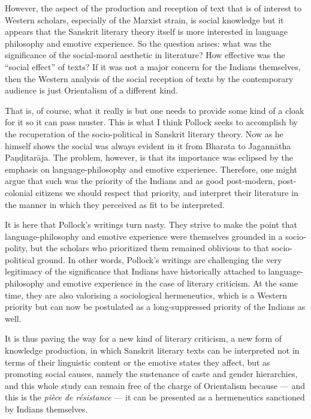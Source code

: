 However, the aspect of the production and reception of text that is of interest to Western scholars, especially of the Marxist strain, is social knowledge but it appears that the Sanskrit literary theory itself is more interested in language philosophy and emotive experience. So the question arises: what was the significance of the social-moral aesthetic in literature? How effective was the ``social effect'' of texts? If it was not a major concern for the Indians themselves, then the Western analysis of the social reception of texts by the contemporary audience is just Orientalism of a different kind.

That is, of course, what it really is but one needs to provide some kind of a cloak for it so it can pass muster. This is what I think Pollock seeks to accomplish by the recuperation of the socio-political in Sanskrit literary theory. Now as he himself shows the social was always evident in it from Bharata to Jagannātha Paṇḍitarāja. The problem, however, is that its importance was eclipsed by the emphasis on language-philosophy and emotive experience. Therefore, one might argue that such was the priority of the Indians and as good post-modern, post-colonial citizens we should respect that priority, and interpret their literature in the manner in which they perceived as fit to be interpreted. 


It is here that Pollock's writings turn nasty. They strive to make the point that language-philosophy and emotive experience were themselves grounded in a socio-polity, but the scholars who prioritized them remained oblivious to that socio-political ground. In other words, Pollock's writings are challenging the very legitimacy of the significance that Indians have historically attached to language-philosophy and emotive experience in the case of literary criticism. At the same time, they are also valorising a sociological hermeneutics, which is a Western priority but can now be postulated as a long-suppressed priority of the Indians as well. 

It is thus paving the way for a new kind of literary criticism, a new form of knowledge production, in which Sanskrit literary texts can be interpreted not in terms of their linguistic content or the emotive states they affect, but as promoting social causes, namely the sustenance of caste and gender hierarchies, and this whole study can remain free of the charge of Orientalism because --- and this is the \textsl{pièce de résistance} --- it can be presented as a hermeneutics sanctioned by Indians themselves.

